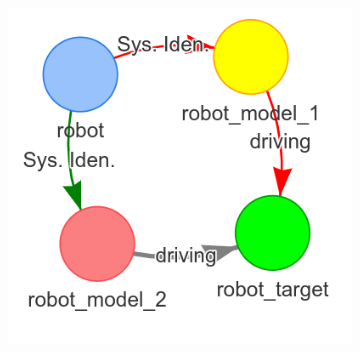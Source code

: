 \begin{figure}[H]
\begin{subfigure}{.3\textwidth}
    \end{subfigure}
    \begin{subfigure}{.3\textwidth}
    \centering
    \includegraphics[width=1\textwidth]{figures/proposed_method/connecting_nodes/failure/fail_6}
    \end{subfigure}


\end{figure}
